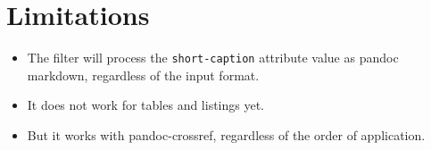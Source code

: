 \hypertarget{limitations}{%
\section{Limitations}\label{limitations}}

\begin{itemize}
\tightlist
\item
  The filter will process the \texttt{short-caption} attribute value as
  pandoc markdown, regardless of the input format.
\item
  It does not work for tables and listings yet.
\item
  But it works with pandoc-crossref, regardless of the order of
  application.
\end{itemize}
